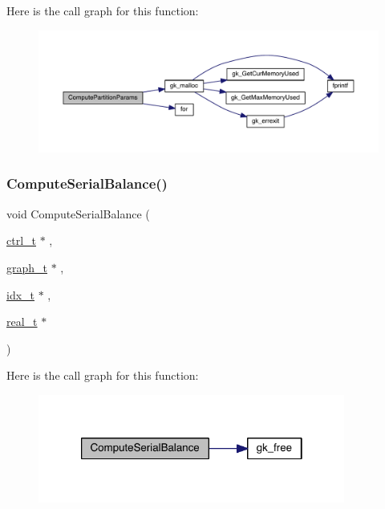 Here is the call graph for this function\+:\nopagebreak
\begin{figure}[H]
\begin{center}
\leavevmode
\includegraphics[width=350pt]{a00951_ad1ea0dae24c2f47fd0813124bff0b66e_cgraph}
\end{center}
\end{figure}
\mbox{\label{a00951_a194836cbebacc2f63a3bb7c5a7422240}} 
\subsubsection{\texorpdfstring{Compute\+Serial\+Balance()}{ComputeSerialBalance()}}
{\footnotesize\ttfamily void Compute\+Serial\+Balance (\begin{DoxyParamCaption}\item[{\hyperlink{a00742}{ctrl\+\_\+t} $\ast$}]{,  }\item[{\hyperlink{a00734}{graph\+\_\+t} $\ast$}]{,  }\item[{\hyperlink{a00876_aaa5262be3e700770163401acb0150f52}{idx\+\_\+t} $\ast$}]{,  }\item[{\hyperlink{a00876_a1924a4f6907cc3833213aba1f07fcbe9}{real\+\_\+t} $\ast$}]{ }\end{DoxyParamCaption})}

Here is the call graph for this function\+:\nopagebreak
\begin{figure}[H]
\begin{center}
\leavevmode
\includegraphics[width=286pt]{a00951_a194836cbebacc2f63a3bb7c5a7422240_cgraph}
\end{center}
\end{figure}
\mbox{\label{a00951_a8b82b59537688df0780d854ed291b2f6}} 

